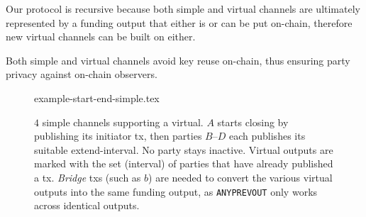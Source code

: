   Our protocol is recursive because both simple and virtual channels are
  ultimately represented by a funding output that either is or can be put
  on-chain, therefore new virtual channels can be built on either.

  Both simple and virtual channels avoid key reuse on-chain, thus ensuring party
  privacy against on-chain observers.

  \begin{figure*}
    \centering
    {example-start-end-simple.tex}
    \caption{$4$ simple channels supporting a virtual. $A$ starts closing by
    publishing its initiator tx, then parties $B$--$D$ each publishes its
    suitable extend-interval. No party stays inactive.
    Virtual outputs are marked with the set (interval) of parties that have
    already published a tx. \emph{Bridge} txs
    (such as $b$) are needed to convert the various virtual outputs into the
    same funding output, as \texttt{ANYPREVOUT} only works across identical
    outputs.}
    \label{figure:example-start-end-simple}
  \end{figure*}

